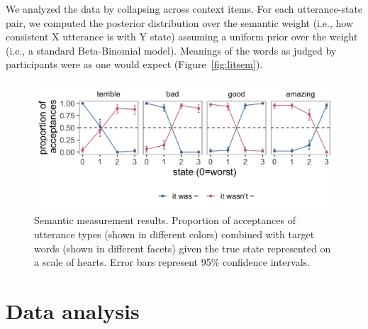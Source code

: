 \documentclass[oneside]{report}
\begin{document}
We analyzed the data by collapsing across context items. For each
utterance-state pair, we computed the posterior distribution over the
semantic weight (i.e., how consistent X utterance is with Y state)
assuming a uniform prior over the weight (i.e., a standard Beta-Binomial
model). Meanings of the words as judged by participants were as one
would expect (Figure~\ref{fig:litsem}).
\begin{figure}[!h]

{\centering \includegraphics[width=\textwidth]{erica_yoon_dissertation_files/figure-latex/litsemPlotPlacement-1} 

}

\caption[Semantic measurement results from the experiment in Chapter 4.]{Semantic measurement results. Proportion of acceptances of utterance types (shown in different colors) combined with target words (shown in different facets) given the true state represented on a scale of hearts. Error bars represent 95\% confidence intervals.}\label{fig:litsemPlotPlacement}
\end{figure}
\section{Data analysis}\label{data-analysis}
\end{document}
